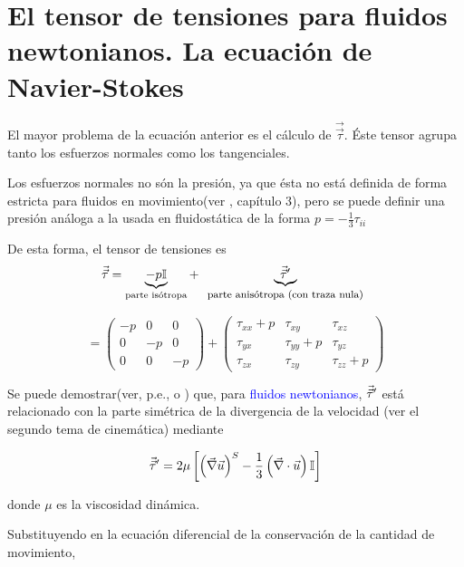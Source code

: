 	

\section{El tensor de tensiones para fluidos newtonianos. La ecuación de Navier-Stokes}

	
	El mayor problema de la ecuación anterior es el cálculo de $\vec{\vec{\tau}}$.
	Éste tensor agrupa tanto los esfuerzos normales como los tangenciales.
	
	Los esfuerzos normales no són la presión, ya que ésta no está definida
	de forma estricta para fluidos en movimiento(ver \cite{Batchelor1997},
	capítulo 3), pero se puede definir una presión análoga a la usada
	en fluidostática de la forma $p=-\frac{1}{3}\tau_{ii}$
	
	De esta forma, el tensor de tensiones es 
	\[
	\tens=\underbrace{-p\mathbb{I}}_{\text{parte isótropa}}+\underbrace{\tens'}_{\begin{footnotesize}\begin{array}{c}
				\text{parte anisótropa (con traza nula)}\end{array}\end{footnotesize}}
	\]
	
	\[
	=\left(\begin{array}{ccc}
		-p & 0 & 0\\
		0 & -p & 0\\
		0 & 0 & -p
	\end{array}\right)+\left(\begin{array}{ccc}
		\tau_{xx}+p & \tau_{xy} & \tau_{xz}\\
		\tau_{yx} & \tau_{yy}+p & \tau_{yz}\\
		\tau_{zx} & \tau_{zy} & \tau_{zz}+p
	\end{array}\right)
	\]
	
	
	Se puede demostrar(ver, p.e., \cite{Batchelor1997} o \cite{CrespoMartinez2006})
	que, para \textcolor{blue}{fluidos newtonianos}, $\vec{\vec \tau}'$ está relacionado
	con la parte simétrica de la divergencia de la velocidad (ver el segundo
	tema de cinemática) mediante 
	
\begin{equation}
		\vec{\vec \tau}'=2\mu\left[\left(\vec{\nabla}\vec{u}\right)^{S}-\frac{1}{3}\left(\vec{\nabla}\cdot\vec{u}\right)\mathbb{I}\right]
\end{equation}
	
	donde $\mu$ es la viscosidad dinámica.
	
	Substituyendo en la ecuación diferencial de la conservación de la
	cantidad de movimiento, 
	
